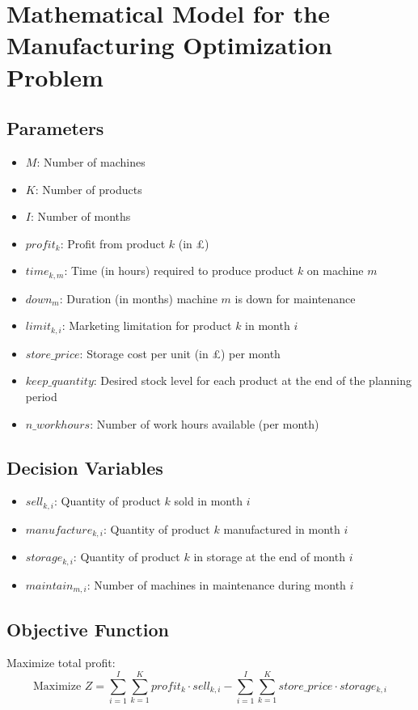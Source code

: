 \documentclass{article}
\begin{document}
\section*{Mathematical Model for the Manufacturing Optimization Problem}

\subsection*{Parameters}
\begin{itemize}
    \item $M$: Number of machines
    \item $K$: Number of products
    \item $I$: Number of months
    \item $profit_k$: Profit from product $k$ (in £)
    \item $time_{k, m}$: Time (in hours) required to produce product $k$ on machine $m$
    \item $down_m$: Duration (in months) machine $m$ is down for maintenance
    \item $limit_{k, i}$: Marketing limitation for product $k$ in month $i$
    \item $store\_price$: Storage cost per unit (in £) per month
    \item $keep\_quantity$: Desired stock level for each product at the end of the planning period
    \item $n\_workhours$: Number of work hours available (per month)
\end{itemize}

\subsection*{Decision Variables}
\begin{itemize}
    \item $sell_{k, i}$: Quantity of product $k$ sold in month $i$
    \item $manufacture_{k, i}$: Quantity of product $k$ manufactured in month $i$
    \item $storage_{k, i}$: Quantity of product $k$ in storage at the end of month $i$
    \item $maintain_{m, i}$: Number of machines in maintenance during month $i$
\end{itemize}

\subsection*{Objective Function}
Maximize total profit:
\begin{equation}
    \text{Maximize } Z = \sum_{i=1}^{I} \sum_{k=1}^{K} profit_k \cdot sell_{k, i} - \sum_{i=1}^{I} \sum_{k=1}^{K} store\_price \cdot storage_{k, i}
\end{equation}
\end{document}

